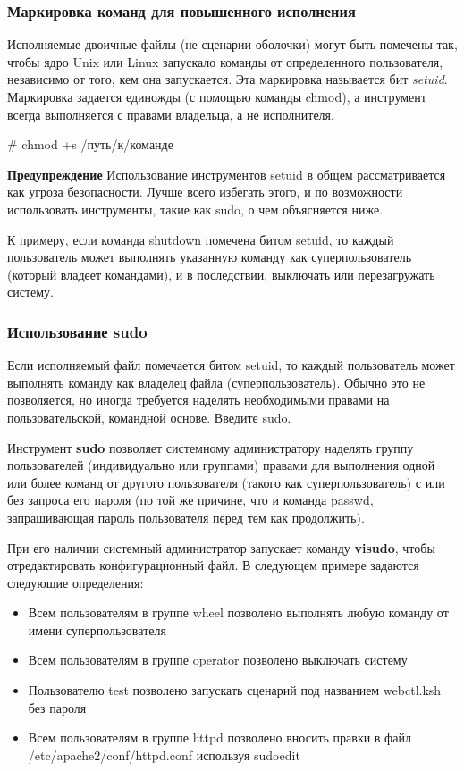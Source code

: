 \documentclass[10pt]{book}
\begin{document}
\subsubsection{Маркировка команд для повышенного исполнения}
Исполняемые двоичные файлы (не сценарии оболочки) могут быть помечены так, чтобы ядро Unix или Linux запускало команды от определенного пользователя, независимо от того, кем она запускается. Эта маркировка называется бит \textit{setuid}. Маркировка задается единожды (с помощью команды chmod), а инструмент всегда выполняется с правами владельца, а не исполнителя.

\begin{tcolorbox}
\# chmod +s /путь/к/команде
\end{tcolorbox}

\textbf{Предупреждение}
Использование инструментов setuid в общем рассматривается как угроза безопасности. Лучше всего избегать этого, и по возможности использовать инструменты, такие как sudo, о чем объясняется ниже.

К примеру, если команда shutdown помечена битом setuid, то каждый пользователь может  выполнять указанную команду как суперпользователь (который владеет командами), и в последствии, выключать или перезагружать систему.

\subsubsection{Использование sudo}
Если исполняемый файл помечается битом setuid, то каждый пользователь может выполнять команду как владелец файла (суперпользователь). Обычно это не позволяется, но иногда требуется наделять необходимыми правами на пользовательской, командной основе. Введите sudo.

Инструмент \textbf{sudo} позволяет системному администратору наделять группу пользователей (индивидуально или группами) правами для выполнения одной или более команд от другого пользователя (такого как суперпользователь) с или без запроса его пароля (по той же причине, что и команда passwd, запрашивающая пароль пользователя перед тем как продолжить).

При его наличии системный администратор запускает команду \textbf{visudo}, чтобы отредактировать конфигурационный файл. В следующем примере задаются следующие определения:
\begin{itemize}
 \item Всем пользователям в группе wheel позволено выполнять любую команду от имени суперпользователя
 \item Всем пользователям в группе operator позволено выключать систему
 \item Пользователю test позволено запускать сценарий под названием webctl.ksh без пароля
 \item Всем пользователям в группе httpd позволено вносить правки в файл /etc/apache2/conf/httpd.conf используя sudoedit
\end{itemize}
\end{document}
